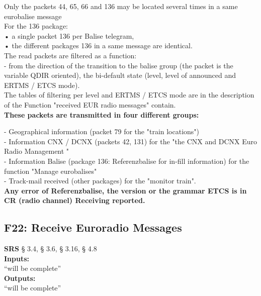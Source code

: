 \documentclass{template/openetcs_report}
\begin{document}
Only the packets 44, 65, 66 and 136 may be located several times in a same eurobalise message\\ 
For the 136 package: \\
• a single packet 136 per Balise telegram, \\
• the different packages 136 in a same message are identical. \\

The read packets are filtered as a function: \\

- from the direction of the transition to the balise group (the packet is the variable 
QDIR oriented), 
the bi-default state (level, level of announced and ERTMS / ETCS mode). \\

The tables of filtering per level and ERTMS / ETCS mode are in the description of the 
Function "received EUR radio messages" contain.\\

\textbf{These packets are transmitted in four different groups:}

- Geographical information (packet 79 for the "train locations") \\

- Information CNX / DCNX (packets 42, 131) for the "the CNX and DCNX 
Euro Radio Management "\\

- Information Balise (package 136: Referenzbalise for in-fill information) for the function 
"Manage eurobalises" \\

- Track-mail received (other packages) for the "monitor train". \\

\textbf{Any error of Referenzbalise, the version or the grammar ETCS is in CR (radio channel) 
Receiving reported.}\\
 
 
 \subsection{F22: Receive Euroradio Messages}
  \textbf{SRS} § 3.4, § 3.6, § 3.16, § 4.8\\
  
    \textbf{Inputs:}\\
``will be complete''\\

 \textbf{Outputs:}\\
 ``will be complete''\\
 
\end{document}
